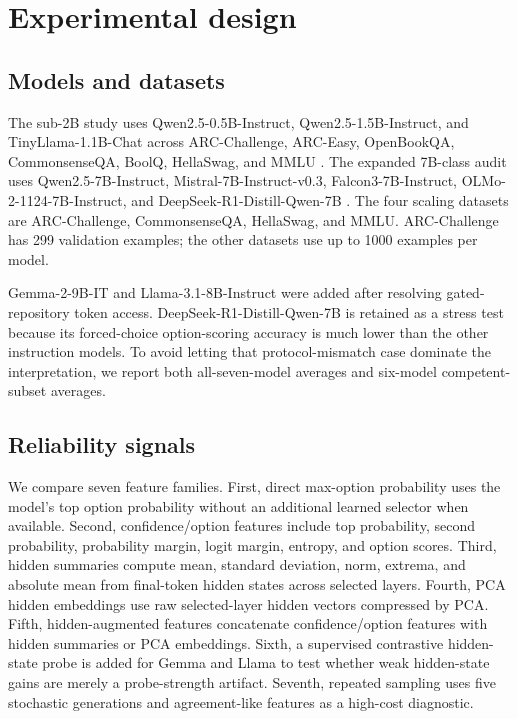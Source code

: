 \documentclass[preprint,12pt,authoryear]{elsarticle}
\begin{document}
\section{Experimental design}
\subsection{Models and datasets}
The sub-2B study uses Qwen2.5-0.5B-Instruct, Qwen2.5-1.5B-Instruct, and TinyLlama-1.1B-Chat across ARC-Challenge, ARC-Easy, OpenBookQA, CommonsenseQA, BoolQ, HellaSwag, and MMLU \citep{clark2018arc,mihaylov2018openbookqa,talmor2019commonsenseqa,clark2019boolq,zellers2019hellaswag,hendrycks2021mmlu,yang2024qwen,zhang2024tinyllama}. The expanded 7B-class audit uses Qwen2.5-7B-Instruct, Mistral-7B-Instruct-v0.3, Falcon3-7B-Instruct, OLMo-2-1124-7B-Instruct, and DeepSeek-R1-Distill-Qwen-7B \citep{yang2024qwen,jiang2023mistral,falcon3modelcard,olmo22025,deepseek2025r1}. The four scaling datasets are ARC-Challenge, CommonsenseQA, HellaSwag, and MMLU. ARC-Challenge has 299 validation examples; the other datasets use up to 1000 examples per model.



Gemma-2-9B-IT and Llama-3.1-8B-Instruct were added after resolving gated-repository token access. DeepSeek-R1-Distill-Qwen-7B is retained as a stress test because its forced-choice option-scoring accuracy is much lower than the other instruction models. To avoid letting that protocol-mismatch case dominate the interpretation, we report both all-seven-model averages and six-model competent-subset averages.

\subsection{Reliability signals}
We compare seven feature families. First, direct max-option probability uses the model's top option probability without an additional learned selector when available. Second, confidence/option features include top probability, second probability, probability margin, logit margin, entropy, and option scores. Third, hidden summaries compute mean, standard deviation, norm, extrema, and absolute mean from final-token hidden states across selected layers. Fourth, PCA hidden embeddings use raw selected-layer hidden vectors compressed by PCA. Fifth, hidden-augmented features concatenate confidence/option features with hidden summaries or PCA embeddings. Sixth, a supervised contrastive hidden-state probe is added for Gemma and Llama to test whether weak hidden-state gains are merely a probe-strength artifact. Seventh, repeated sampling uses five stochastic generations and agreement-like features as a high-cost diagnostic.
\end{document}

